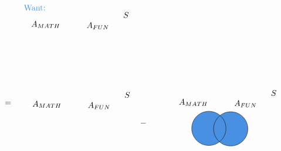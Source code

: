 \documentclass[12pt]{article}
\begin{document}
\[\begin{tikzpicture}[x=0.75pt,y=0.75pt,yscale=-1,xscale=1]
    \draw  [draw opacity=0][fill={rgb, 255:red, 74; green, 144; blue, 226 }  ,fill opacity=1 ] (364.74,218.33) .. controls (364.74,202.97) and (377.19,190.51) .. (392.55,190.51) .. controls (407.92,190.51) and (420.37,202.97) .. (420.37,218.33) .. controls (420.37,233.69) and (407.92,246.14) .. (392.55,246.14) .. controls (377.19,246.14) and (364.74,233.69) .. (364.74,218.33) -- cycle ;
    \draw  [fill={rgb, 255:red, 74; green, 144; blue, 226 }  ,fill opacity=1 ] (329.19,217.56) .. controls (329.19,202.19) and (341.65,189.74) .. (357.01,189.74) .. controls (372.37,189.74) and (384.83,202.19) .. (384.83,217.56) .. controls (384.83,232.92) and (372.37,245.37) .. (357.01,245.37) .. controls (341.65,245.37) and (329.19,232.92) .. (329.19,217.56) -- cycle ;
    \draw   (364.74,218.33) .. controls (364.74,202.97) and (377.19,190.51) .. (392.55,190.51) .. controls (407.92,190.51) and (420.37,202.97) .. (420.37,218.33) .. controls (420.37,233.69) and (407.92,246.14) .. (392.55,246.14) .. controls (377.19,246.14) and (364.74,233.69) .. (364.74,218.33) -- cycle ;
    
    \draw (216.67,27.13) node [anchor=north west][inner sep=0.75pt]    {$S$};
    \draw (66.97,41.53) node [anchor=north west][inner sep=0.75pt]    {$A_{MATH}$};
    \draw (156.97,43.76) node [anchor=north west][inner sep=0.75pt]    {$A_{FUN}$};
    \draw (55,15) node [anchor=north west][inner sep=0.75pt]  [color={rgb, 255:red, 74; green, 144; blue, 226 }  ,opacity=1 ] [align=left] {Want:};
    \draw (24,173.4) node [anchor=north west][inner sep=0.75pt]    {$=$};
    \draw (218.67,157.13) node [anchor=north west][inner sep=0.75pt]    {$S$};
    \draw (68.97,171.53) node [anchor=north west][inner sep=0.75pt]    {$A_{MATH}$};
    \draw (158.97,173.76) node [anchor=north west][inner sep=0.75pt]    {$A_{FUN}$};
    \draw (244,203.4) node [anchor=north west][inner sep=0.75pt]    {$-$};
    \draw (456.67,154.13) node [anchor=north west][inner sep=0.75pt]    {$S$};
    \draw (306.97,168.53) node [anchor=north west][inner sep=0.75pt]    {$A_{MATH}$};
    \draw (396.97,170.76) node [anchor=north west][inner sep=0.75pt]    {$A_{FUN}$};
    
    
    \end{tikzpicture}
    \]
\end{document}
